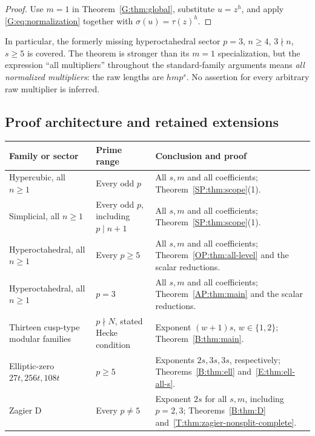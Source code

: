 \documentclass[11pt,a4paper]{article}
\theoremstyle{definition}\newtheorem{definition}[theorem]{Definition}
\theoremstyle{remark}\newtheorem{remark}[theorem]{Remark}
\numberwithin{equation}{section}
\begin{document}
\begin{proof}
Use $m=1$ in Theorem~\ref{G:thm:global}, substitute $u=z^h$, and
apply \eqref{G:eq:normalization} together with $\sigma(u)=\tau(z)^h$.
\end{proof}

In particular, the formerly missing hyperoctahedral sector
$p=3$, $n\ge4$, $3\nmid n$, $s\ge5$ is covered. The theorem is
stronger than its $m=1$ specialization, but the expression ``all
multipliers'' throughout the standard-family arguments means
\emph{all normalized multipliers}: the raw lengths are $hmp^s$.
No assertion for every arbitrary raw multiplier is inferred.

\subsection{Proof architecture and retained extensions}
\begin{center}\small
\renewcommand{\arraystretch}{1.18}
\begin{tabularx}{\textwidth}{@{}>{\raggedright\arraybackslash}p{}>{\raggedright\arraybackslash}p{}>{\raggedright\arraybackslash}X@{}}
\toprule
Family or sector&Prime range&Conclusion and proof\\\midrule
Hypercubic, all $n\ge1$&Every odd $p$&All $s,m$ and all coefficients;
Theorem~\ref{SP:thm:scope}(1).\\
Simplicial, all $n\ge1$&Every odd $p$, including $p\mid n+1$&All $s,m$ and all coefficients;
Theorem~\ref{SP:thm:scope}(1).\\
Hyperoctahedral, all $n\ge1$&Every $p\ge5$&All $s,m$ and all coefficients;
Theorem~\ref{OP:thm:all-level} and the scalar reductions.\\
Hyperoctahedral, all $n\ge1$&$p=3$&All $s,m$ and all coefficients;
Theorem~\ref{AP:thm:main} and the scalar reductions.\\
Thirteen cusp-type modular families&$p\nmid N$, stated Hecke condition&Exponent $(w+1)s$, $w\in\{1,2\}$;
Theorem~\ref{B:thm:main}.\\
Elliptic-zero $27t,256t,108t$&$p\ge5$&Exponents $2s,3s,3s$, respectively;
Theorems~\ref{B:thm:ell} and~\ref{E:thm:ell-all-s}.\\
Zagier D&Every $p\ne5$&Exponent $2s$ for all $s,m$, including $p=2,3$;
Theorems~\ref{B:thm:D} and~\ref{T:thm:zagier-nonsplit-complete}.\\
\bottomrule
\end{tabularx}
\end{center}
\end{document}
